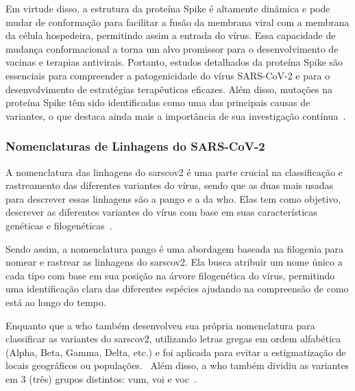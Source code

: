 Em virtude disso, a estrutura da proteína Spike é altamente dinâmica e pode mudar de conformação para facilitar a fusão da membrana viral com a membrana da célula hospedeira, permitindo assim a entrada do vírus. Essa capacidade de mudança conformacional a torna um alvo promissor para o desenvolvimento de vacinas e terapias antivirais. Portanto, estudos detalhados da proteína Spike são essenciais para compreender a patogenicidade do vírus SARS-CoV-2 e para o desenvolvimento de estratégias terapêuticas eficazes. Além disso, mutações na proteína Spike têm sido identificadas como uma das principais causas de variantes, o que destaca ainda mais a importância de sua investigação contínua~\cite{covid19_cascella_2020}.

\subsubsection{Nomenclaturas de Linhagens do SARS-CoV-2}
A nomenclatura das linhagens do \gls{sarscov2} é uma parte crucial na classificação e rastreamento das diferentes variantes do vírus, sendo que as duas mais usadas para descrever essas linhagens são a \gls{pango} e a da \gls{who}. Elas tem como objetivo, descrever as diferentes variantes do vírus com base em suas características genéticas e filogenéticas~\cite{pango_rambaut_2020,who_variants}.

Sendo assim, a nomenclatura \gls{pango} é uma abordagem baseada na filogenia para nomear e rastrear as linhagens do \gls{sarscov2}. Ela busca atribuir um nome único a cada tipo com base em sua posição na árvore filogenética do vírus, permitindo uma identificação clara das diferentes espécies ajudando na compreensão de como está ao longo do tempo.~\cite{pango_rambaut_2020}

Enquanto que a \gls{who} também desenvolveu sua própria nomenclatura para classificar as variantes do \gls{sarscov2}, utilizando letras gregas em ordem alfabética (Alpha, Beta, Gamma, Delta, etc.) e foi aplicada para evitar a estigmatização de locais geográficos ou populações.~\cite{who_variants,covid_current_chenchula_2022,covid_raman_2021} Além disso, a \gls{who} também dividiu as variantes em 3 (três) grupos distintos: \gls{vum}, \gls{voi} e \gls{voc}~\cite{covid19_cascella_2020,covid_raman_2021}.

